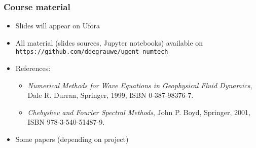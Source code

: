 \documentclass[aspectratio=43,9pt]{beamer}
\begin{document}
%
%
\begin{frame}
	\frametitle{Course material}
	\vspace*{-5mm}
	\begin{itemize}
		\item Slides will appear on Ufora\vspace*{3ex}
		\item All material (slides sources, Jupyter notebooks) available on \texttt{https://github.com/ddegrauwe/ugent\_numtech}\vspace*{3ex}
		\item References:\vspace*{2ex}
			\begin{itemize}
				\item \emph{Numerical Methods for Wave Equations in Geophysical Fluid Dynamics},\\ Dale R. Durran, Springer, 1999, ISBN 0-387-98376-7.\vspace*{2ex}
				\item \emph{Chebyshev and Fourier Spectral Methods}, John P. Boyd, Springer, 2001, ISBN 978-3-540-51487-9.\vspace*{3ex}
			\end{itemize}
		\item Some papers (depending on project)
	\end{itemize}
\end{frame}
%
%
\end{document}
